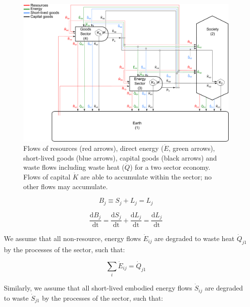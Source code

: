 \begin{figure}[h!]
\includegraphics[width=1.0\linewidth]{Chapter_Example_D/images/PERKS_two_sector.pdf}
\caption{Flows of resources (red arrows), direct energy ($\dot{E}$, green arrows), short-lived goods (blue arrows), capital goods (black arrows) and waste flows including waste heat ($\dot{Q}$) for a two sector economy. Flows of capital $\dot{K}$ are able to accumulate within the sector; no other flows may accumulate.}
\label{fig:PERKS}
\end{figure}

\begin{equation}\label{eq:D_def_S_L}
B_{j} \equiv S_{j} + L_{j} = L_{j}
\end{equation}



\begin{equation}\label{eq:D_def_acc_S_L}
\frac{\textrm{d}B_{j}}{\textrm{dt}} =\frac{\textrm{d}S_{j}}{\textrm{dt}} + \frac{\textrm{d}L_{j}}{\textrm{dt}} = \frac{\textrm{d}L_{j}}{\textrm{dt}}
\end{equation}

We assume that all non-resource, energy flows $\dot{E}_{ij}$ are degraded to waste heat $\dot{Q}_{j1}$ by the processes of the sector, such that:

\begin{equation}\label{eq:D_E_balance}
\sum_{i} \dot{E}_{ij} = \dot{Q}_{j1}
\end{equation}

Similarly, we assume that all short-lived embodied energy flows $\dot{S}_{ij}$ are degraded to waste $\dot{S}_{j1}$ by the processes of the sector, such that:

